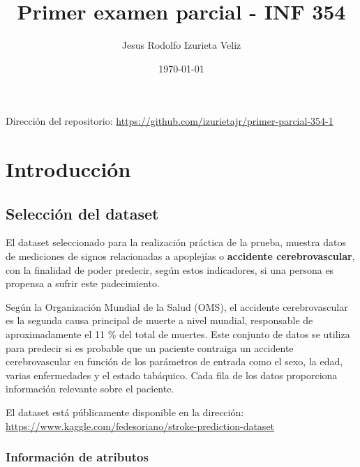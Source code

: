\documentclass[letter]{article}
\author{Jesus Rodolfo Izurieta Veliz}
\date{\today}
\title{Primer examen parcial - INF 354}
\begin{document}
\maketitle
Dirección del repositorio: \url{https://github.com/izurietajr/primer-parcial-354-1}

\section{Introducción}
\label{sec:org77bb214}

\subsection{Selección del dataset}
\label{sec:orgbf254c6}

El dataset seleccionado para la realización práctica de la prueba, muestra datos
de mediciones de signos relacionadas a apoplejías o \textbf{accidente cerebrovascular}, con la
finalidad de poder predecir, según estos indicadores, si una persona es propensa
a sufrir este padecimiento.

Según la Organización Mundial de la Salud (OMS), el accidente cerebrovascular es
la segunda causa principal de muerte a nivel mundial, responsable de
aproximadamente el 11 \% del total de muertes. Este conjunto de datos se utiliza
para predecir si es probable que un paciente contraiga un accidente
cerebrovascular en función de los parámetros de entrada como el sexo, la edad,
varias enfermedades y el estado tabáquico. Cada fila de los datos proporciona
información relevante sobre el paciente.

El dataset está públicamente disponible en la dirección: \url{https://www.kaggle.com/fedesoriano/stroke-prediction-dataset}

\subsubsection{Información de atributos}
\label{sec:org9f76a79}
\end{document}
